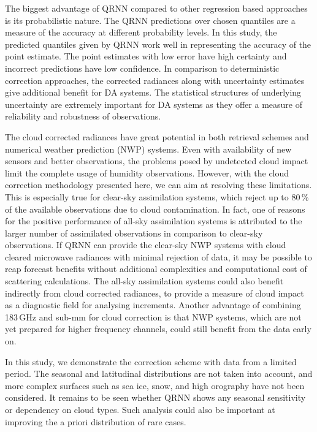 \documentclass[amt, manuscript]{copernicus}
\begin{document}
The biggest advantage of QRNN compared to other regression based approaches is its probabilistic nature. The QRNN predictions over chosen quantiles are a measure of the accuracy at different probability levels. In this study, the predicted quantiles given by QRNN work well in representing the accuracy of the point estimate. The point estimates with low error have high certainty and incorrect predictions have low confidence. In comparison to deterministic correction approaches, the corrected radiances along with uncertainty estimates give additional benefit for DA systems. The statistical structures of underlying uncertainty are extremely important for DA systems as they offer a measure of reliability and robustness of observations.

The cloud corrected radiances have great potential in both retrieval schemes and numerical weather prediction (NWP) systems. Even with availability of new sensors and better observations, the problems posed by undetected cloud impact limit the complete usage of humidity observations. However, with the cloud correction methodology presented here, we can aim at resolving these limitations. This is especially true for clear-sky assimilation systems, which reject up to 80\,\% of the available observations due to cloud contamination. In fact, one of reasons for the positive performance of all-sky assimilation systems is attributed to the larger number of assimilated observations in comparison to clear-sky observations. If QRNN can provide the clear-sky NWP systems with cloud cleared microwave radiances with minimal rejection of data, it may be possible to reap forecast benefits without additional complexities and computational cost of scattering calculations. The all-sky assimilation systems could also benefit indirectly from cloud corrected radiances, to provide a measure of cloud impact as a diagnostic field for analysing increments. Another advantage of combining 183\,GHz and sub-mm for cloud correction is that NWP systems, which are not yet prepared for higher frequency channels, could still benefit from the data early on. 

In this study, we demonstrate the correction scheme with data from a limited period. The seasonal and latitudinal distributions are not taken into account, and more complex surfaces such as sea ice, snow, and high orography have not been considered. It remains to be seen whether QRNN shows any seasonal sensitivity or dependency on cloud types. Such analysis could also be important at improving the a priori distribution of rare cases. 
\end{document}
